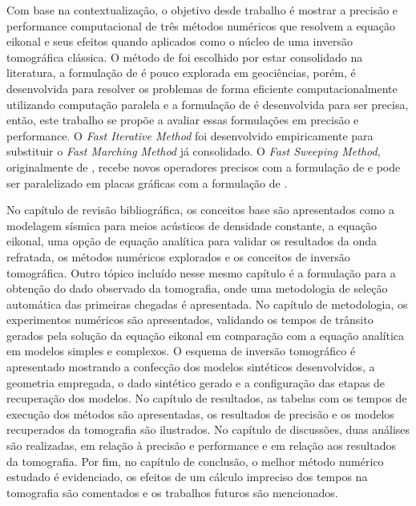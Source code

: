 Com base na contextualização, o objetivo desde trabalho é mostrar a precisão e performance computacional de três métodos numéricos que resolvem a equação eikonal e seus efeitos quando aplicados como o núcleo de uma inversão tomográfica clássica. O método de  foi escolhido por estar consolidado na literatura, a formulação de  é pouco explorada em geociências, porém, é desenvolvida para resolver os problemas de forma eficiente computacionalmente utilizando computação paralela e a formulação de  é desenvolvida para ser precisa, então, este trabalho se propõe a avaliar essas formulações em precisão e performance. O \textit{Fast Iterative Method} \cite{jeong2008fast} foi desenvolvido empiricamente para substituir o \textit{Fast Marching Method} \cite{sethian19993} já consolidado. O \textit{Fast Sweeping Method}, originalmente de , recebe novos operadores precisos com a formulação de  e pode ser paralelizado em placas gráficas com a formulação de .
 
No capítulo de revisão bibliográfica, os conceitos base são apresentados como a modelagem sísmica para meios acústicos de densidade constante, a equação eikonal, uma opção de equação analítica para validar os resultados da onda refratada, os métodos numéricos explorados e os conceitos de inversão tomográfica. Outro tópico incluído nesse mesmo capítulo é a formulação para a obtenção do dado observado da tomografia, onde uma metodologia de seleção automática das primeiras chegadas é apresentada. No capítulo de metodologia, os experimentos numéricos são apresentados, validando os tempos de trânsito gerados pela solução da equação eikonal em comparação com a equação analítica em modelos simples e complexos. O esquema de inversão tomográfico é apresentado mostrando a confecção dos modelos sintéticos desenvolvidos, a geometria empregada, o dado sintético gerado e a configuração das etapas de recuperação dos modelos. No capítulo de resultados, as tabelas com os tempos de execução dos métodos são apresentadas, os resultados de precisão e os modelos recuperados da tomografia são ilustrados. No capítulo de discussões, duas análises são realizadas, em relação à precisão e performance e em relação aos resultados da tomografia. Por fim, no capítulo de conclusão, o melhor método numérico estudado é evidenciado, os efeitos de um cálculo impreciso dos tempos na tomografia são comentados e os trabalhos futuros são mencionados.

